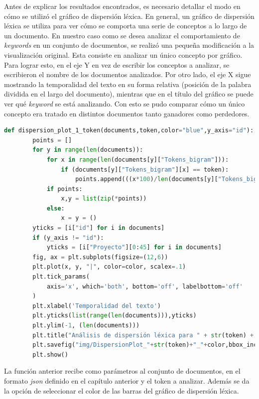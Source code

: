     Antes de explicar los resultados encontrados, es necesario detallar el modo en cómo se utilizó el gráfico de dispersión léxica. En general, un gráfico de dispersión léxica se utiliza para ver cómo se comporta una serie de conceptos a lo largo de un documento. En nuestro caso como se desea analizar el comportamiento de \textit{keywords} en un conjunto de documentos, se realizó una pequeña modificación a la visualización original. Esta consiste en analizar un único concepto por gráfico. Para lograr esto, en el eje Y en vez de escribir los conceptos a analizar, se escribieron el nombre de los documentos analizados. Por otro lado, el eje X sigue mostrando la temporalidad del texto en su forma relativa (posición de la palabra dividida en el largo del documento), mientras que en el título del gráfico se puede ver qué \textit{keyword} se está analizando. Con esto se pudo comparar cómo un único concepto era tratado en distintos documentos tanto ganadores como perdedores.
    
    \begin{lstlisting}[language=Python]
    def dispersion_plot_1_token(documents,token,color="blue",y_axis="id"):
        points = []
        for y in range(len(documents)):
            for x in range(len(documents[y]["Tokens_bigram"])):
                if (documents[y]["Tokens_bigram"][x] == token):
                    points.append(((x*100)/len(documents[y]["Tokens_bigram"]),y))
            if points:
                x,y = list(zip(*points))
            else:
                x = y = ()
        yticks = [i["id"] for i in documents]
        if (y_axis != "id"):
            yticks = [i["Proyecto"][0:45] for i in documents]
        fig, ax = plt.subplots(figsize=(12,6))
        plt.plot(x, y, "|", color=color, scalex=.1)
        plt.tick_params(
            axis='x', which='both', bottom='off', labelbottom='off'
        )
        plt.xlabel('Temporalidad del texto')
        plt.yticks(list(range(len(documents))),yticks)
        plt.ylim(-1, (len(documents)))
        plt.title("Análisis de dispersión léxica para " + str(token) + " en propuestas " + documents[0]["Estado"]+"s")
        plt.savefig("img/DispersionPlot_"+str(token)+"_"+color,bbox_inches='tight')
        plt.show()
    \end{lstlisting}
    
    La función anterior recibe como parámetros al conjunto de documentos, en el formato \textit{json} definido en el capítulo anterior y el token a analizar. Además se da la opción de seleccionar el color de las barras del gráfico de dispersión léxica.
    
